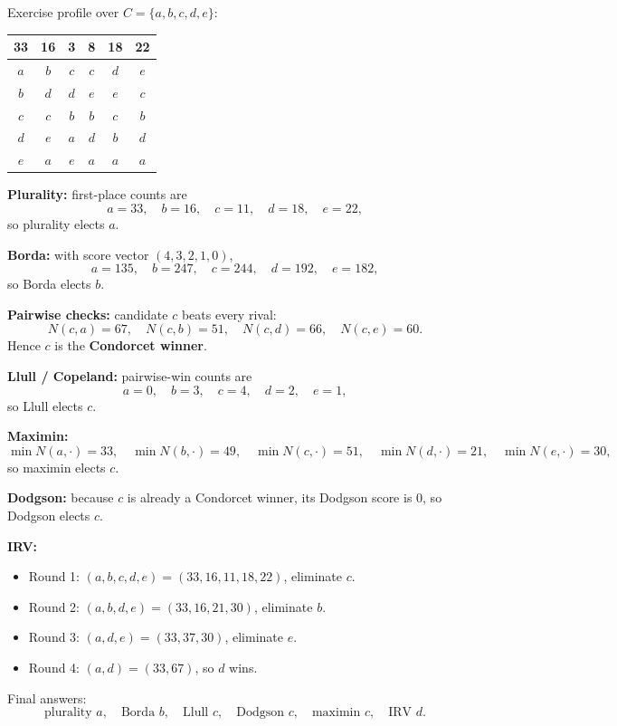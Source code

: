\begin{exbox}
Exercise profile over $C = \{a,b,c,d,e\}$:

\begin{center}
\renewcommand{\arraystretch}{1.15}
\begin{tabular}{@{}cccccc@{}}
\toprule
\textbf{33} & \textbf{16} & \textbf{3} & \textbf{8} & \textbf{18} & \textbf{22} \\
\midrule
$a$ & $b$ & $c$ & $c$ & $d$ & $e$ \\
$b$ & $d$ & $d$ & $e$ & $e$ & $c$ \\
$c$ & $c$ & $b$ & $b$ & $c$ & $b$ \\
$d$ & $e$ & $a$ & $d$ & $b$ & $d$ \\
$e$ & $a$ & $e$ & $a$ & $a$ & $a$ \\
\bottomrule
\end{tabular}
\end{center}

\textbf{Plurality:} first-place counts are
\[
  a=33,\quad b=16,\quad c=11,\quad d=18,\quad e=22,
\]
so plurality elects $a$.

\textbf{Borda:} with score vector $(4,3,2,1,0)$,
\[
  a=135,\quad b=247,\quad c=244,\quad d=192,\quad e=182,
\]
so Borda elects $b$.

\textbf{Pairwise checks:} candidate $c$ beats every rival:
\[
  N(c,a)=67,\quad N(c,b)=51,\quad N(c,d)=66,\quad N(c,e)=60.
\]
Hence $c$ is the \textbf{Condorcet winner}.

\textbf{Llull / Copeland:} pairwise-win counts are
\[
  a=0,\quad b=3,\quad c=4,\quad d=2,\quad e=1,
\]
so Llull elects $c$.

\textbf{Maximin:}
\[
  \min N(a,\cdot)=33,\quad
  \min N(b,\cdot)=49,\quad
  \min N(c,\cdot)=51,\quad
  \min N(d,\cdot)=21,\quad
  \min N(e,\cdot)=30,
\]
so maximin elects $c$.

\textbf{Dodgson:} because $c$ is already a Condorcet winner, its Dodgson score is 0, so Dodgson elects $c$.

\textbf{IRV:}
\begin{itemize}
  \item Round 1: $(a,b,c,d,e)=(33,16,11,18,22)$, eliminate $c$.
  \item Round 2: $(a,b,d,e)=(33,16,21,30)$, eliminate $b$.
  \item Round 3: $(a,d,e)=(33,37,30)$, eliminate $e$.
  \item Round 4: $(a,d)=(33,67)$, so $d$ wins.
\end{itemize}

Final answers:
\[
  \text{plurality } a,\quad
  \text{Borda } b,\quad
  \text{Llull } c,\quad
  \text{Dodgson } c,\quad
  \text{maximin } c,\quad
  \text{IRV } d.
\]
\end{exbox}

